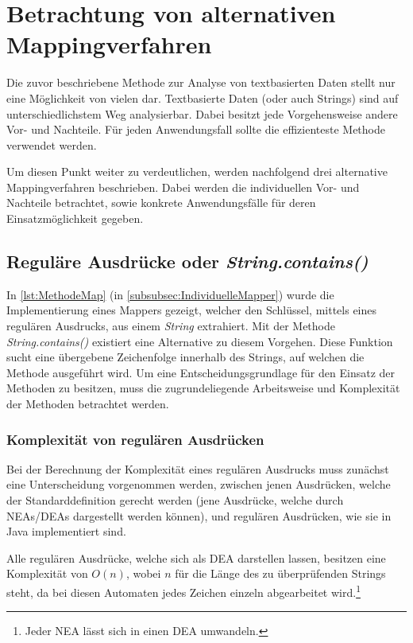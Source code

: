 \section{Betrachtung von alternativen Mappingverfahren}
Die zuvor beschriebene Methode zur Analyse von textbasierten Daten stellt nur eine Möglichkeit von vielen dar. Textbasierte Daten (oder auch Strings) sind auf unterschiedlichstem Weg analysierbar. Dabei besitzt jede Vorgehensweise andere Vor- und Nachteile. Für jeden Anwendungsfall sollte die effizienteste Methode verwendet werden.

Um diesen Punkt weiter zu verdeutlichen, werden nachfolgend drei alternative Mappingverfahren beschrieben. Dabei werden die individuellen Vor- und Nachteile betrachtet, sowie konkrete Anwendungsfälle für deren Einsatzmöglichkeit gegeben. 

\subsection{Reguläre Ausdrücke oder \textit{String.contains()}}\label{subsec:Contains}
In \autoref{lst:MethodeMap} (in \autoref{subsubsec:IndividuelleMapper}) wurde die Implementierung eines Mappers gezeigt, welcher den Schlüssel, mittels eines regulären Ausdrucks, aus einem \textit{String} extrahiert. Mit der Methode \textit{String.contains()} existiert eine Alternative zu diesem Vorgehen. Diese Funktion sucht eine übergebene Zeichenfolge innerhalb des Strings, auf welchen die Methode ausgeführt wird. Um eine Entscheidungsgrundlage für den Einsatz der Methoden zu besitzen, muss die zugrundeliegende Arbeitsweise und Komplexität der Methoden betrachtet werden.

\subsubsection{Komplexität von regulären Ausdrücken}
Bei der Berechnung der Komplexität eines regulären Ausdrucks muss zunächst eine Unterscheidung vorgenommen werden, zwischen jenen Ausdrücken, welche der Standarddefinition gerecht werden (jene Ausdrücke, welche durch {\color{LinkColor}\acsp{NEA}}/{\color{LinkColor}\acsp{DEA}} dargestellt werden können), und regulären Ausdrücken, wie sie in Java implementiert sind.

Alle regulären Ausdrücke, welche sich als \acs{DEA} darstellen lassen, besitzen eine Komplexität von $O(n)$, wobei $n$ für die Länge des zu überprüfenden Strings steht, da bei diesen Automaten jedes Zeichen einzeln abgearbeitet wird.\footnote{Jeder \acs{NEA} lässt sich in einen \acs{DEA} umwandeln.}

